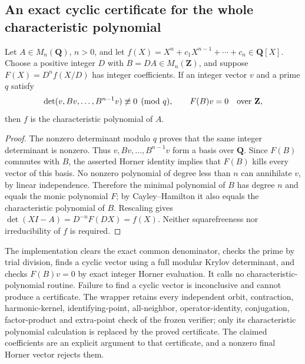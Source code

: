 \subsection{An exact cyclic certificate for the whole characteristic polynomial}
\begin{proposition}
Let $A\in M_n(\mathbf Q)$, $n>0$, and let
$f(X)=X^n+c_1X^{n-1}+\cdots+c_n\in\mathbf Q[X]$.
Choose a positive integer $D$ with $B=DA\in M_n(\mathbf Z)$,
and suppose $F(X)=D^nf(X/D)$ has integer coefficients.
If an integer vector $v$ and a prime $q$ satisfy
\[
 \det(v,Bv,\ldots,B^{n-1}v)\not\equiv0\pmod q,
 \qquad F(B)v=0\quad\hbox{over }\mathbf Z,
\]
then $f$ is the characteristic polynomial of $A$.
\end{proposition}
\begin{proof}
The nonzero determinant modulo $q$ proves that the same integer
determinant is nonzero. Thus $v,Bv,\ldots,B^{n-1}v$ form a basis
over $\mathbf Q$. Since $F(B)$ commutes with $B$, the asserted
Horner identity implies that $F(B)$ kills every vector of this
basis. No nonzero polynomial of degree less than $n$ can
annihilate $v$, by linear independence. Therefore the minimal
polynomial of $B$ has degree $n$ and equals the monic polynomial
$F$; by Cayley--Hamilton it also equals the characteristic
polynomial of $B$. Rescaling gives
$\det(XI-A)=D^{-n}F(DX)=f(X)$.
Neither squarefreeness nor irreducibility of $f$ is required.
\end{proof}

The implementation  clears
the exact common denominator, checks the prime by trial division,
finds a cyclic vector using a full modular Krylov determinant,
and checks $F(B)v=0$ by exact integer Horner evaluation.
It calls no characteristic-polynomial routine. Failure to find
a cyclic vector is inconclusive and cannot produce a certificate.
The wrapper  retains every
independent orbit, contraction, harmonic-kernel, identifying-point,
all-neighbor, operator-identity, conjugation, factor-product and
extra-point check of the frozen verifier; only its characteristic
polynomial calculation is replaced by the proved certificate.
The claimed coefficients are an explicit argument to that
certificate, and a nonzero final Horner vector rejects them.
